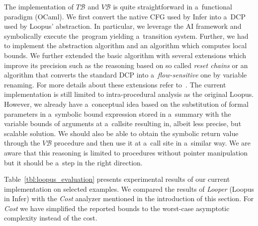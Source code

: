 \documentclass{ExcelAtFIT}
\begin{document}
The implementation of $T\mathcal{B}$ and
$V\mathcal{B}$ is quite straightforward in
a~functional paradigm (OCaml). We first convert
the native CFG used by Infer into a~DCP used
by Loopus' abstraction. In particular, we
leverage the AI framework and symbolically
execute the~program yielding a~transition system.
Further, we had to implement the abstraction
algorithm and an algorithm which computes local
bounds. We further extended the basic algorithm
with several extensions which improve its precision
such as the reasoning based on so called
\textit{reset chains} or an algorithm that converts
the standard DCP into a~\textit{flow-sensitive} one
by variable renaming. For more details about these
extensions refer to~\cite{loopus-tool}. The current
implementation is still limited to intra-procedural
analysis as the original Loopus. However, we already
have a~conceptual idea based on the substitution of
formal parameters in a~symbolic bound expression stored
in a~summary with the variable bounds of arguments at
a~callsite resulting in, albeit less precise, but
scalable solution. We should also be able to obtain
the symbolic return value through the $V\mathcal{B}$
procedure and then use it at a~call site in a~similar
way. We are aware that this reasoning is limited to
procedures without pointer manipulation but it should
be a~step in the right direction.

Table~\ref{tbl:loopus_evaluation} presents experimental
results of our current implementation on selected
examples. We compared the results of \textit{Looper}
(Loopus in Infer) with the \textit{Cost} analyzer
mentioned in the introduction of this section.
For \textit{Cost} we have simplified the reported
bounds to the worst-case asymptotic complexity
instead of the cost.

\newcommand{\bad}[1]{\textcolor{red}{\textbf{#1}}}
\newcommand{\good}[1]{\textcolor{darkgreen}{\textbf{#1}}}
\end{document}
